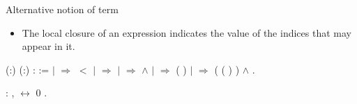 \documentclass[10pt]{beamer}
\begin{document}
\begin{frame}[fragile]{Alternative notion of term}
  \begin{itemize}
  \item The local closure of an expression indicates the value of the
    indices that may appear in it.
  \end{itemize}
  \begin{coqdoccode}
     
    (:) (:)
    :  :=\coqdoceol \coqdocindent{1.00em}
      \coqdoceol
    \coqdocindent{1.00em} \ensuremath{|} 
     \ensuremath{\Rightarrow}   \ensuremath{<}
    \coqdoceol \coqdocindent{1.00em} \ensuremath{|}
      \ensuremath{\Rightarrow}
    \coqdoceol \coqdocindent{1.00em} \ensuremath{|}
      
    \ensuremath{\Rightarrow}  
     \ensuremath{\land}  
    \coqdoceol \coqdocindent{1.00em} \ensuremath{|}
      \ensuremath{\Rightarrow}
     ( )
    \coqdoceol \coqdocindent{1.00em} \ensuremath{|}
      
    \ensuremath{\Rightarrow} ( (
    ) ) \ensuremath{\land}
      \coqdoceol
    \coqdocindent{1.00em} .\coqdoceol
  \end{coqdoccode}

  \begin{coqdoccode}
   :
  \coqdockw{\ensuremath{\forall}} , 
   \ensuremath{\leftrightarrow}  0
  .\coqdoceol
\end{coqdoccode}

\end{frame}
\end{document}
